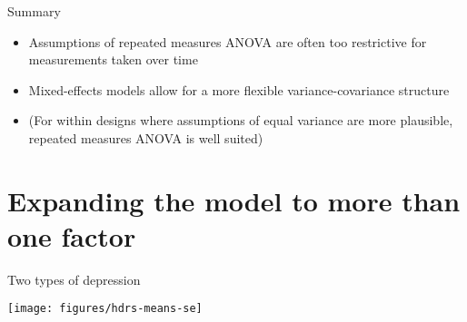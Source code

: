 \documentclass[aspectratio=169]{beamer}
\begin{document}
\begin{frame}{Summary}
  \begin{itemize}
    \item Assumptions of repeated measures ANOVA are often too restrictive
      for measurements taken over time
    \item Mixed-effects models allow for a more flexible variance-covariance
      structure
    \item (For within designs where assumptions of equal variance are more
      plausible, repeated measures ANOVA is well suited)
  \end{itemize}
  \vfill
\end{frame}

\appendix

\section{Expanding the model to more than one factor}

\begin{frame}{Two types of depression}
\begin{center}
\texttt{[image: figures/hdrs-means-se]}
\end{center}
\end{frame}
\end{document}
